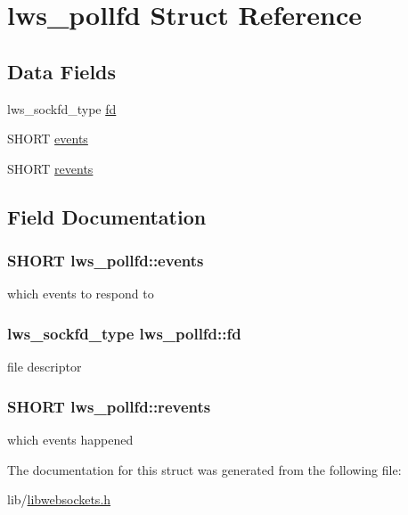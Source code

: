 \hypertarget{structlws__pollfd}{}\section{lws\+\_\+pollfd Struct Reference}
\label{structlws__pollfd}
\subsection*{Data Fields}
\begin{DoxyCompactItemize}
\item 
lws\+\_\+sockfd\+\_\+type \hyperlink{structlws__pollfd_a714cf5ca90b41926117fdde9fa6542be}{fd}
\item 
S\+H\+O\+RT \hyperlink{structlws__pollfd_ac393db6fc7fb6ed8fe7ca20936908ee9}{events}
\item 
S\+H\+O\+RT \hyperlink{structlws__pollfd_ae7cecfe7511c59d4a3a44f876d030932}{revents}
\end{DoxyCompactItemize}


\subsection{Field Documentation}
\subsubsection[{\texorpdfstring{events}{events}}]{\setlength{\rightskip}{0pt plus 5cm}S\+H\+O\+RT lws\+\_\+pollfd\+::events}\hypertarget{structlws__pollfd_ac393db6fc7fb6ed8fe7ca20936908ee9}{}\label{structlws__pollfd_ac393db6fc7fb6ed8fe7ca20936908ee9}
which events to respond to 
\subsubsection[{\texorpdfstring{fd}{fd}}]{\setlength{\rightskip}{0pt plus 5cm}lws\+\_\+sockfd\+\_\+type lws\+\_\+pollfd\+::fd}\hypertarget{structlws__pollfd_a714cf5ca90b41926117fdde9fa6542be}{}\label{structlws__pollfd_a714cf5ca90b41926117fdde9fa6542be}
file descriptor 
\subsubsection[{\texorpdfstring{revents}{revents}}]{\setlength{\rightskip}{0pt plus 5cm}S\+H\+O\+RT lws\+\_\+pollfd\+::revents}\hypertarget{structlws__pollfd_ae7cecfe7511c59d4a3a44f876d030932}{}\label{structlws__pollfd_ae7cecfe7511c59d4a3a44f876d030932}
which events happened 

The documentation for this struct was generated from the following file\+:\begin{DoxyCompactItemize}
\item 
lib/\hyperlink{libwebsockets_8h}{libwebsockets.\+h}\end{DoxyCompactItemize}
